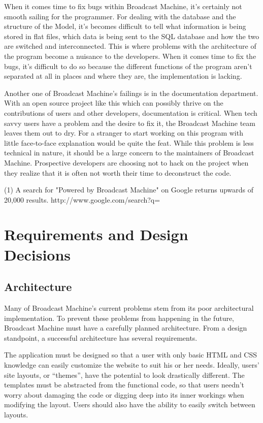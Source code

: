 \documentclass[a4paper,12pt]{report}
\begin{document}
	  When it comes time to fix bugs within Broadcast Machine, it’s certainly not smooth sailing for the programmer. For dealing with the database and the structure of the Model, it’s becomes difficult to tell what information is being stored in flat files, which data is being sent to the SQL database and how the two are switched and interconnected. This is where problems with the architecture of the program become a nuisance to the developers. When it comes time to fix the bugs, it’s difficult to do so because the different functions of the program aren’t separated at all in places and where they are, the implementation is lacking. 

	Another one of Broadcast Machine’s failings is in the documentation department. With an open source project like this which can possibly thrive on the contributions of users and other developers, documentation is critical. When tech savvy users have a problem and the desire to fix it, the Broadcast Machine team leaves them out to dry. For a stranger to start working on this program with little face-to-face explanation would be quite the feat. While this problem is less technical in nature, it should be a large concern to the maintainers of Broadcast Machine. Prospective developers are choosing not to hack on the project when they realize that it is often not worth their time to deconstruct the code. 

(1) A search for "Powered by Broadcast Machine" on Google returns upwards of 20,000 results.
http://www.google.com/search?q=%

\chapter{Requirements and Design Decisions}

\section{Architecture}

	Many of Broadcast Machine’s current problems stem from its poor architectural implementation. To prevent these problems from happening in the future, Broadcast Machine must have a carefully planned architecture. From a design standpoint, a successful architecture has several requirements.

The application must be designed so that a user with only basic HTML and CSS knowledge can easily customize the website to suit his or her needs. Ideally, users’ site layouts, or “themes”, have the potential to look drastically different. The templates must be abstracted from the functional code, so that users needn’t worry about damaging the code or digging deep into its inner workings when modifying the layout. Users should also have the ability to easily switch between layouts.
\end{document}
